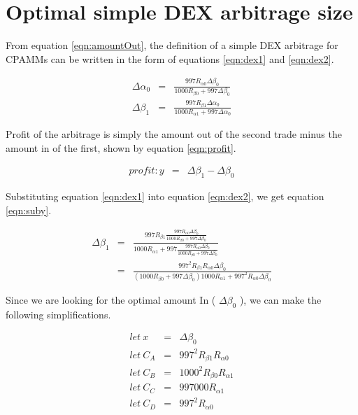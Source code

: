 \documentclass[runningheads]{llncs}
\begin{document}
\section{Optimal simple DEX arbitrage size}
From equation \ref{eqn:amountOut}, the definition of a simple DEX arbitrage for CPAMMs can be written in the form of equations \ref{eqn:dex1} and \ref{eqn:dex2}.

\begin{eqnarray}
	\Delta\alpha_{0}  &=& \frac{997 R_{\alpha 0} \Delta\beta_{0} }{1000 R_{\beta 0} + 997 \Delta\beta_{0}} \label{eqn:dex1}\\
	\Delta\beta_{1}  &=& \frac{997 R_{\beta 1} \Delta\alpha_{0} }{1000 R_{\alpha 1} + 997 \Delta\alpha_{0}} \label{eqn:dex2}
\end{eqnarray}

Profit of the arbitrage is simply the amount out of the second trade minus the amount in of the first, shown by equation \ref{eqn:profit}.

\begin{eqnarray}
	profit: y  &=& \Delta\beta_{1} - \Delta\beta_{0} \label{eqn:profit}
\end{eqnarray}

Substituting equation \ref{eqn:dex1} into equation \ref{eqn:dex2}, we get equation \ref{eqn:suby}.

\begin{eqnarray}
	\Delta\beta_{1}  &=& \frac{997 R_{\beta 1} \frac{997 R_{\alpha 0} \Delta\beta_{0} }{1000 R_{\beta 0} + 997 \Delta\beta_{0}} }{1000 R_{\alpha 1} + 997 \frac{997 R_{\alpha 0} \Delta\beta_{0} }{1000 R_{\beta 0} + 997 \Delta\beta_{0}}} \label{eqn:suby}\\
	&=& \frac{997^2 R_{\beta 1}  R_{\alpha 0} \Delta\beta_{0} }{(1000 R_{\beta 0} + 997 \Delta\beta_{0}) 1000 R_{\alpha 1} + 997^2 R_{\alpha 0} \Delta\beta_{0} } \label{eqn:subyMore}
\end{eqnarray}

Since we are looking for the optimal amount In ( \(\Delta\beta_{0}\) ), we can make the following simplifications.

\begin{eqnarray}
	let \: x &=& \Delta\beta_{0}\\
	let \: C_{A} &=& 997^2 R_{\beta 1}  R_{\alpha 0}\\
	let \: C_{B} &=& 1000^2 R_{\beta 0} R_{\alpha 1}\\
	let \: C_{C} &=& 997000  R_{\alpha 1}\\
	let \: C_{D} &=& 997^2  R_{\alpha 0}
\end{eqnarray}
\end{document}
